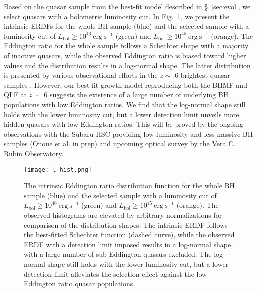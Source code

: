 \documentclass[twocolumn, twocolappendix]{aastex63}
\newcommand{\Lbol}{L_\mathrm{bol}}
\begin{document}
\begin{CJK*}{UTF8}{gbsn}
Based on the quasar sample from the best-fit model described in \S~\ref{sec:evol}, 
we select quasars with a bolometric luminosity cut.
In Fig.~\ref{fig:lhist}, we present the intrinsic ERDFs for the whole BH sample (blue) and the selected sample with
a luminosity cut of $\Lbol \geq 10^{46}~\mathrm{erg~s^{-1}}$ (green) and $\Lbol \geq 10^{45}~\mathrm{erg~s^{-1}}$ (orange).  
The Eddington ratio for the whole sample follows a Schechter shape with a majority of inactive quasars, 
while the observed Eddington ratio is biased toward higher values and the distribution results in a log-normal shape. 
The latter distribution is presented by various observational efforts in the $z\sim$ 6 brightest quasar samples 
\citep[e.g.,][]{2010AJ....140..546W,2019ApJ...873...35S,2022arXiv220705113F}.
However, our best-fit growth model reproducing both the BHMF and QLF at $z\sim$ 6 suggests the existence of
a large number of underlying BH populations with low Eddington ratios. 
We find that the log-normal shape still holds with the lower luminosity cut, 
but a lower detection limit unveils more hidden quasars with low Eddington ratios. 
This will be proved by the ongoing observations with the Subaru HSC providing low-luminosity and less-massive BH samples
(Onoue et al. in prep) and upcoming optical survey by the Vera C. Rubin Observatory.



\begin{figure}
\centering
\texttt{[image: l\_hist.png]}
\caption{
The intrinsic Eddington ratio distribution function for the whole BH sample (blue) and the selected sample with
a luminosity cut of $\Lbol \geq 10^{46}~\mathrm{erg~s^{-1}}$ (green) and $\Lbol \geq 10^{45}~\mathrm{erg~s^{-1}}$ (orange).  
The observed histograms are elevated by arbitrary normalizations for comparison of the distribution shapes.
The intrinsic ERDF follows the best-fitted Schechter function (dashed curve), 
while the observed ERDF with a detection limit imposed results in a log-normal shape, 
with a large number of sub-Eddington quasars excluded.
The log-normal shape still holds with the lower luminosity cut, 
but a lower detection limit alleviates the selection effect against the low Eddington ratio quasar populations.
}
\label{fig:lhist}
\end{figure}
  



\end{CJK*}
\end{document}
